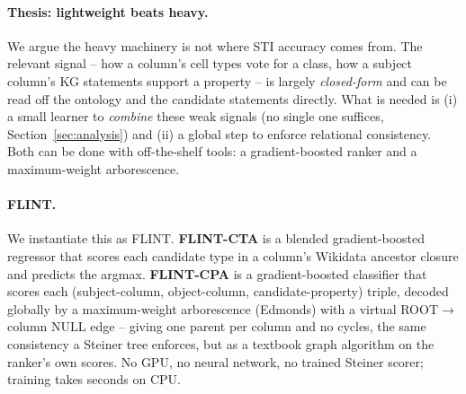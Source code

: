 \documentclass[11pt]{article}
\begin{document}
\paragraph{Thesis: lightweight beats heavy.} We argue the heavy machinery is not
where STI accuracy comes from. The relevant signal -- how a column's cell types vote
for a class, how a subject column's KG statements support a property -- is largely
\emph{closed-form} and can be read off the ontology and the candidate statements
directly. What is needed is (i) a small learner to \emph{combine} these weak signals
(no single one suffices, Section~\ref{sec:analysis}) and (ii) a global step to
enforce relational consistency. Both can be done with off-the-shelf tools: a
gradient-boosted ranker and a maximum-weight arborescence.

\paragraph{FLINT.} We instantiate this as FLINT. \textbf{FLINT-CTA} is a blended
gradient-boosted regressor that scores each candidate type in a column's Wikidata
ancestor closure and predicts the argmax. \textbf{FLINT-CPA} is a gradient-boosted
classifier that scores each (subject-column, object-column, candidate-property)
triple, decoded globally by a maximum-weight arborescence (Edmonds) with a virtual
ROOT$\to$column NULL edge -- giving one parent per column and no cycles, the same
consistency a Steiner tree enforces, but as a textbook graph algorithm on the
ranker's own scores. No GPU, no neural network, no trained Steiner scorer; training
takes seconds on CPU.
\end{document}
